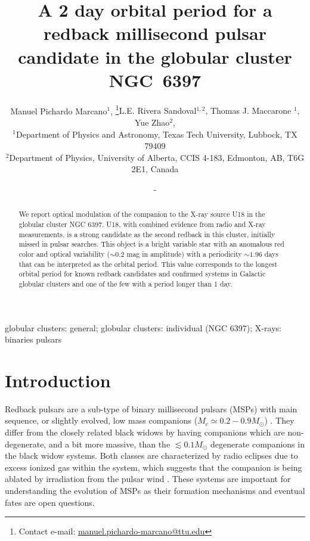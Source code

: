 \documentclass[fleqn,usenatbib,useAMS,letters]{mnras}
\title[A 2 day orbital period for a redback MSP Candidate in the Globular Cluster NGC~6397]{A 2 day orbital period for a redback millisecond pulsar candidate in the globular cluster NGC~6397}
\author[Manuel Pichardo Marcano, other]{Manuel Pichardo Marcano$^{1}$, \thanks{Contact e-mail: \href{manuel.pichardo-marcano@ttu.edu}{manuel.pichardo-marcano@ttu.edu}}{L.E. Rivera Sandoval$^{1,2}$, Thomas J.  Maccarone $^{1}$, Yue Zhao$^{2}$, }
\newauthor{Craig O. Heinke$^{2}$}%
\\
$^{1}$Department of Physics and Astronomy, Texas Tech University, Lubbock, TX 79409\\
$^{2}$Department of Physics, University of Alberta, CCIS 4-183, Edmonton, AB, T6G 2E1, Canada}
\date{-}
\begin{document}
\label{firstpage}
\pagerange{\pageref{firstpage}--\pageref{lastpage}}
\maketitle

\begin{abstract}
We report optical modulation of the companion to the %
X-ray source 
U18 in the globular cluster NGC 6397. U18, with combined evidence from radio and X-ray measurements, is a strong candidate as the second redback in this cluster, initially missed in pulsar searches. This object is a bright variable star with an anomalous red color and optical variability ($\sim0.2$ mag in amplitude) with a periodicity $\sim 1.96$ days that can be interpreted as the orbital period. This value corresponds to the longest orbital period for known redback candidates and confirmed systems in Galactic globular clusters and one of the few with a period longer than 1 day. 
\end{abstract}

\begin{keywords}
globular clusters: general; globular clusters: individual (NGC 6397); X-rays: binaries pulsars
\end{keywords}




\section{Introduction}

Redback pulsars are a sub-type of binary millisecond pulsars (MSPs) with main sequence, or slightly evolved, low mass companions ($M_{c} \simeq 0.2 - 0.9 M_\odot$) \citep{MalloryRedback2013}. They differ from the closely related black widows by having companions which are non-degenerate, and a bit more massive, than the $\lesssim0.1 M_\odot$  degenerate companions in the black widow systems. Both classes are characterized by radio eclipses due to excess ionized gas within the system, which suggests that the companion is being ablated by irradiation from the pulsar wind \citep{FruchterEclipse1988,Fruchter88b}. These systems are important for understanding the evolution of MSPs as their formation mechanisms and eventual fates are open questions.
\end{document}
